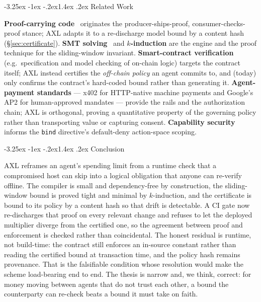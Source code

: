 \documentclass[11pt]{article}
\makeatletter
\renewcommand\section{\@startsection{section}{1}{\z@}%
  {-3.25ex \@plus -1ex \@minus -.2ex}{1.4ex \@plus.2ex}%
  {\normalfont\sffamily\Large\bfseries}}
\theoremstyle{plain}
\theoremstyle{definition}
\theoremstyle{remark}
\makeatother
\begin{document}
\section{Related Work}

\textbf{Proof-carrying code}~\citep{necula1997} originates the
producer-ships-proof, consumer-checks-proof stance; AXL adapts it to a
re-discharge model bound by a content hash (\S\ref{sec:certificate}).
\textbf{SMT solving}~\citep{demoura2008} and \textbf{$k$-induction}
\citep{sheeran2000} are the engine and the proof technique for the
sliding-window invariant. \textbf{Smart-contract verification} (e.g.\
specification and model checking of on-chain logic) targets the contract
itself; AXL instead certifies the \emph{off-chain policy} an agent commits to,
and (today) only confirms the contract's hard-coded bound rather than
generating it. \textbf{Agent-payment standards} --- x402 for HTTP-native
machine payments and Google's AP2 for human-approved mandates --- provide the
rails and the authorization chain; AXL is orthogonal, proving a quantitative
property of the governing policy rather than transporting value or capturing
consent. \textbf{Capability security} informs the \texttt{bind} directive's
default-deny action-space scoping.

\section{Conclusion}

AXL reframes an agent's spending limit from a runtime check that a compromised
host can skip into a logical obligation that anyone can re-verify offline. The
compiler is small and dependency-free by construction, the sliding-window
bound is proved tight and minimal by $k$-induction, and the certificate is
bound to its policy by a content hash so that drift is detectable. A CI gate
now re-discharges that proof on every relevant change and refuses to let the
deployed multiplier diverge from the certified one, so the agreement between
proof and enforcement is checked rather than coincidental. The honest residual
is runtime, not build-time: the contract still enforces an in-source constant
rather than reading the certified bound at transaction time, and the policy hash
remains provenance. That is the falsifiable condition whose resolution would
make the scheme load-bearing end to end. The thesis is narrow and, we think,
correct: for money moving between agents that do not trust each other, a bound
the counterparty can re-check beats a bound it must take on faith.
\end{document}
